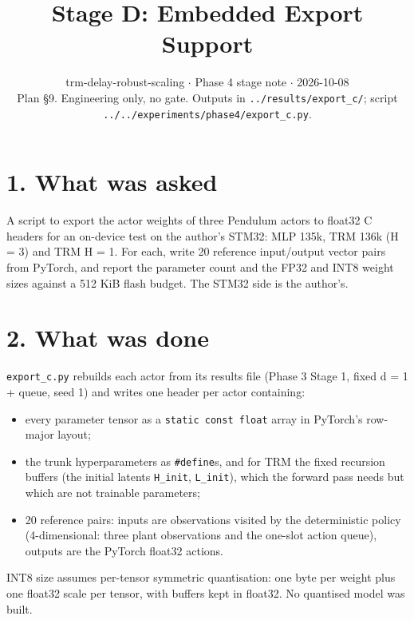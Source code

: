 \documentclass[11pt]{article}
\title{Stage D: Embedded Export Support}
\author{}
\date{trm-delay-robust-scaling $\cdot$ Phase 4 stage note $\cdot$ 2026-10-08\\[2pt]Plan \S{}9. Engineering only, no gate. Outputs in \texttt{.\allowbreak{}.\allowbreak{}/\allowbreak{}results/\allowbreak{}export\_\allowbreak{}c/\allowbreak{}}; script \texttt{.\allowbreak{}.\allowbreak{}/\allowbreak{}.\allowbreak{}.\allowbreak{}/\allowbreak{}experiments/\allowbreak{}phase4/\allowbreak{}export\_\allowbreak{}c.\allowbreak{}py}.}
\begin{document}
\maketitle
\section*{1. What was asked}



A script to export the actor weights of three Pendulum actors to float32 C headers for an on-device test on the author's STM32: MLP 135k, TRM 136k (H = 3) and TRM H = 1. For each, write 20 reference input/output vector pairs from PyTorch, and report the parameter count and the FP32 and INT8 weight sizes against a 512 KiB flash budget. The STM32 side is the author's.



\section*{2. What was done}



\texttt{export\_c.py} rebuilds each actor from its results file (Phase 3 Stage 1, fixed d = 1 + queue, seed 1) and writes one header per actor containing:



\begin{itemize}
\item every parameter tensor as a \texttt{static const float} array in PyTorch's row-major layout;
\item the trunk hyperparameters as \texttt{\#define}s, and for TRM the fixed recursion buffers (the initial latents \texttt{H\_init}, \texttt{L\_init}), which the forward pass needs but which are not trainable parameters;
\item 20 reference pairs: inputs are observations visited by the deterministic policy (4-dimensional: three plant observations and the one-slot action queue), outputs are the PyTorch float32 actions.
\end{itemize}



INT8 size assumes per-tensor symmetric quantisation: one byte per weight plus one float32 scale per tensor, with buffers kept in float32. No quantised model was built.
\end{document}
